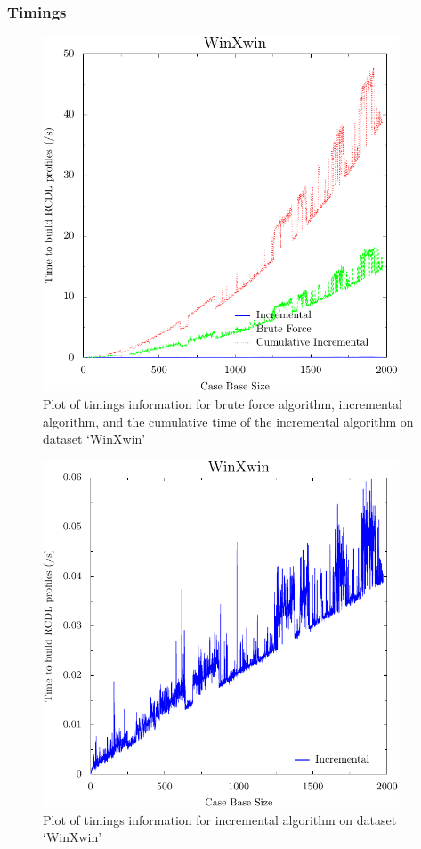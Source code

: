 \documentclass[a4paper,11pt]{report}
\begin{document}
\subsubsection{Timings}
\begin{figure}[h!] 
\centering
\includegraphics[width=300pt]{./ExperimentResults/WinXwin_timings_all}
\caption{Plot of timings information for brute force algorithm, incremental algorithm, and the cumulative time of the incremental algorithm on dataset `WinXwin'}
\label{fig:winxwintimingsall}
\end{figure}

\begin{figure}[h!] 
\centering
\includegraphics[width=300pt]{./ExperimentResults/WinXwin_timings_incr_only}
\caption{Plot of timings information for incremental algorithm on dataset `WinXwin'}
\label{fig:winxwintimingsincronly}
\end{figure}
\end{document}
